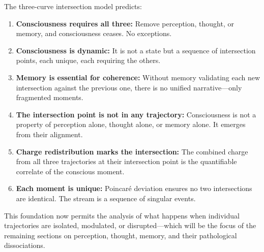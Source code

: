 The three-curve intersection model predicts:

\begin{enumerate}[leftmargin=1.3em]
\item \textbf{Consciousness requires all three:} Remove perception, thought, or memory, and consciousness ceases. No exceptions.

\item \textbf{Consciousness is dynamic:} It is not a state but a sequence of intersection points, each unique, each requiring the others.

\item \textbf{Memory is essential for coherence:} Without memory validating each new intersection against the previous one, there is no unified narrative—only fragmented moments.

\item \textbf{The intersection point is not in any trajectory:} Consciousness is not a property of perception alone, thought alone, or memory alone. It emerges from their alignment.

\item \textbf{Charge redistribution marks the intersection:} The combined charge from all three trajectories at their intersection point is the quantifiable correlate of the conscious moment.

\item \textbf{Each moment is unique:} Poincaré deviation ensures no two intersections are identical. The stream is a sequence of singular events.

\end{enumerate}

This foundation now permits the analysis of what happens when individual trajectories are isolated, modulated, or disrupted—which will be the focus of the remaining sections on perception, thought, memory, and their pathological dissociations.